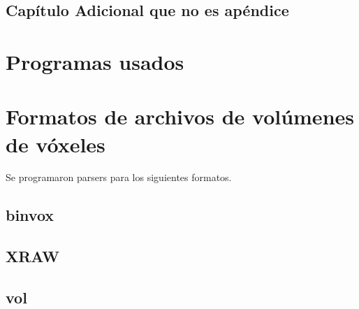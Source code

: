 \begin{additional} 
\section{Capítulo Adicional que no es apéndice}
\end{additional}

\begin{appendix}
\section{Programas usados}

\section{Formatos de archivos de volúmenes de vóxeles}

Se programaron parsers para los siguientes formatos.

\subsection{binvox}
\subsection{XRAW}
\subsection{vol}

\end{appendix}

